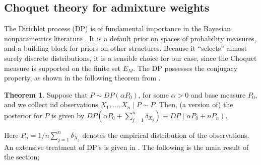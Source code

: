 \documentclass[12pt, reqno]{amsart}
\theoremstyle{definition}
\newtheorem{theorem}{Theorem}%
\begin{document}
\subsection{Choquet theory for admixture weights}\label{choq_mix}





The Dirichlet process (DP) is of fundamental importance in the Bayesian nonparametrics literature \cite{ferguson1974, ghosal_vdv, ghosh}. It is a default prior on spaces of probability measures, and a building block for priors on other structures. Because it ``selects'' almost surely discrete distributions, it is a sensible choice for our case, since the Choquet measure is supported on the finite set $E_M$. The DP possesses the conjugacy property, as shown in the following theorem from \cite{ferguson1974}.



\begin{theorem}
Suppose that $P\sim DP(\alpha P_0)$, for some $\alpha>0$ and base measure $P_0$, and we collect iid observations $X_1,\ldots,X_n\mid P \sim P$. Then, (a version of) the posterior for $P$ is given by $DP(\alpha P_0 + \sum_{j=1}^n \delta_{X_j}) \equiv DP(\alpha P_0 +nP_n)$. 
\end{theorem}
Here $P_n=1/n \sum_{j=1}^n \delta_{X_j}$ denotes the empirical distribution of the observations. An extensive treatment of DP's is given in \cite[Chapter 4]{ghosal_vdv}. The following is the main result of the section; 
\end{document}

